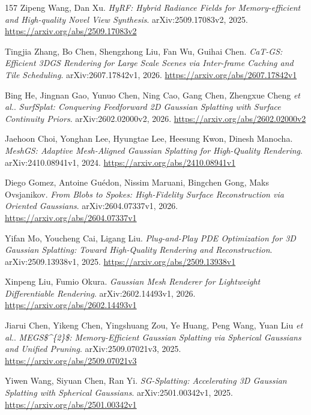 \documentclass[11pt,a4paper]{article}
\begin{document}
\begin{thebibliography}{157}
Zipeng Wang, Dan Xu.
\newblock \emph{HyRF: Hybrid Radiance Fields for Memory-efficient and High-quality Novel View Synthesis}.
\newblock arXiv:2509.17083v2, 2025.
\newblock \url{https://arxiv.org/abs/2509.17083v2}

Tingjia Zhang, Bo Chen, Shengzhong Liu, Fan Wu, Guihai Chen.
\newblock \emph{CaT-GS: Efficient 3DGS Rendering for Large Scale Scenes via Inter-frame Caching and Tile Scheduling}.
\newblock arXiv:2607.17842v1, 2026.
\newblock \url{https://arxiv.org/abs/2607.17842v1}

Bing He, Jingnan Gao, Yunuo Chen, Ning Cao, Gang Chen, Zhengxue Cheng \emph{et al.}.
\newblock \emph{SurfSplat: Conquering Feedforward 2D Gaussian Splatting with Surface Continuity Priors}.
\newblock arXiv:2602.02000v2, 2026.
\newblock \url{https://arxiv.org/abs/2602.02000v2}

Jaehoon Choi, Yonghan Lee, Hyungtae Lee, Heesung Kwon, Dinesh Manocha.
\newblock \emph{MeshGS: Adaptive Mesh-Aligned Gaussian Splatting for High-Quality Rendering}.
\newblock arXiv:2410.08941v1, 2024.
\newblock \url{https://arxiv.org/abs/2410.08941v1}

Diego Gomez, Antoine Gu\'{e}don, Nissim Maruani, Bingchen Gong, Maks Ovsjanikov.
\newblock \emph{From Blobs to Spokes: High-Fidelity Surface Reconstruction via Oriented Gaussians}.
\newblock arXiv:2604.07337v1, 2026.
\newblock \url{https://arxiv.org/abs/2604.07337v1}

Yifan Mo, Youcheng Cai, Ligang Liu.
\newblock \emph{Plug-and-Play PDE Optimization for 3D Gaussian Splatting: Toward High-Quality Rendering and Reconstruction}.
\newblock arXiv:2509.13938v1, 2025.
\newblock \url{https://arxiv.org/abs/2509.13938v1}

Xinpeng Liu, Fumio Okura.
\newblock \emph{Gaussian Mesh Renderer for Lightweight Differentiable Rendering}.
\newblock arXiv:2602.14493v1, 2026.
\newblock \url{https://arxiv.org/abs/2602.14493v1}

Jiarui Chen, Yikeng Chen, Yingshuang Zou, Ye Huang, Peng Wang, Yuan Liu \emph{et al.}.
\newblock \emph{MEGS\$\textasciicircum{}\{2\}\$: Memory-Efficient Gaussian Splatting via Spherical Gaussians and Unified Pruning}.
\newblock arXiv:2509.07021v3, 2025.
\newblock \url{https://arxiv.org/abs/2509.07021v3}

Yiwen Wang, Siyuan Chen, Ran Yi.
\newblock \emph{SG-Splatting: Accelerating 3D Gaussian Splatting with Spherical Gaussians}.
\newblock arXiv:2501.00342v1, 2025.
\newblock \url{https://arxiv.org/abs/2501.00342v1}


\end{thebibliography}
\end{document}
